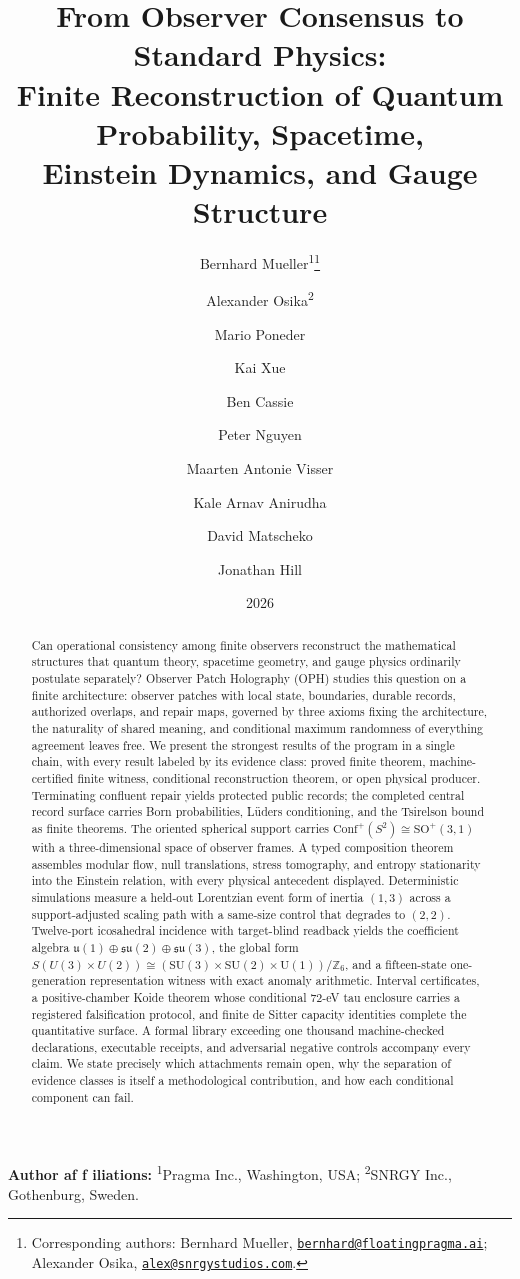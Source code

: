 \documentclass[11pt]{article}
\title{From Observer Consensus to Standard Physics:\\
Finite Reconstruction of Quantum Probability, Spacetime,\\
Einstein Dynamics, and Gauge Structure}
\author{Bernhard Mueller\textsuperscript{1}\thanks{\protect\raggedright
Corresponding authors: Bernhard Mueller,
\href{mailto:bernhard@floatingpragma.ai}{\texttt{bernhard@floatingpragma.ai}};
Alexander Osika,
\href{mailto:alex@snrgystudios.com}{\texttt{alex@snrgystudios.com}}.}
\and Alexander Osika\textsuperscript{2} \and Mario Poneder \and Kai Xue
\and Ben Cassie \and Peter Nguyen \and Maarten Antonie Visser
\and Kale Arnav Anirudha \and David Matscheko \and Jonathan Hill}
\date{2026}
\theoremstyle{remark}
\begin{document}
\maketitle

\begin{center}
\small\textbf{Author af\kern0pt f\kern0pt iliations:}
\textsuperscript{1}Pragma Inc., Washington, USA;
\textsuperscript{2}SNRGY Inc., Gothenburg, Sweden.
\end{center}

\begin{abstract}
Can operational consistency among finite observers reconstruct the
mathematical structures that quantum theory, spacetime geometry, and gauge
physics ordinarily postulate separately? Observer Patch Holography (OPH)
studies this question on a finite architecture: observer patches with local
state, boundaries, durable records, authorized overlaps, and repair maps,
governed by three axioms fixing the architecture, the naturality of shared
meaning, and conditional maximum randomness of everything agreement leaves
free. We present the strongest results of the program in a single chain, with
every result labeled by its evidence class: proved finite theorem,
machine-certified finite witness, conditional reconstruction theorem, or open
physical producer. Terminating confluent repair yields protected public
records; the completed central record surface carries Born probabilities,
L\"uders conditioning, and the Tsirelson bound as finite theorems. The
oriented spherical support carries
$\mathrm{Conf}^{+}(S^{2})\cong\mathrm{SO}^{+}(3,1)$ with a three-dimensional
space of observer frames. A typed composition theorem assembles modular flow,
null translations, stress tomography, and entropy stationarity into the
Einstein relation, with every physical antecedent displayed. Deterministic
simulations measure a held-out Lorentzian event form of inertia $(1,3)$ across
a support-adjusted scaling path with a same-size control that degrades to
$(2,2)$. Twelve-port icosahedral incidence with target-blind readback yields
the coefficient algebra
$\mathfrak u(1)\oplus\mathfrak{su}(2)\oplus\mathfrak{su}(3)$, the global form
$S(U(3)\times U(2))\cong(\mathrm{SU}(3)\times\mathrm{SU}(2)\times
\mathrm{U}(1))/\mathbb Z_{6}$, and a fifteen-state one-generation
representation witness with exact anomaly arithmetic. Interval certificates,
a positive-chamber Koide theorem whose conditional $72$-eV tau enclosure
carries a registered falsification protocol, and finite de Sitter capacity
identities complete the quantitative surface. A
formal library exceeding one thousand machine-checked declarations,
executable receipts, and adversarial negative controls accompany every
claim. We state
precisely which attachments remain open, why the separation of evidence
classes is itself a methodological contribution, and how each conditional
component can fail.
\end{abstract}
\end{document}
